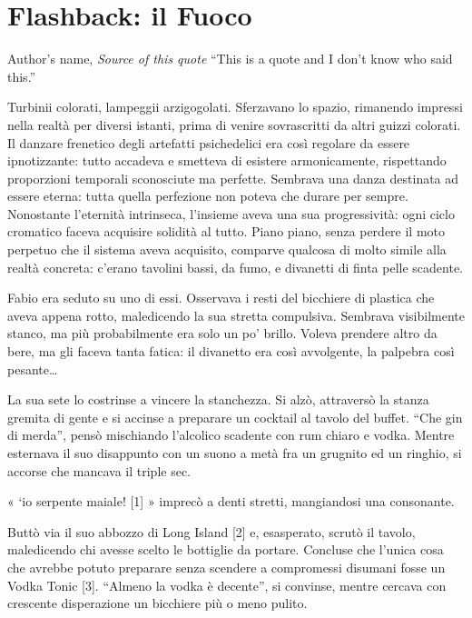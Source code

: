 \chapter{Flashback: il Fuoco}

\begin{chapquote}{Author's name, \textit{Source of this quote}}
``This is a quote and I don't know who said this.''
\end{chapquote}

Turbinii colorati, lampeggii arzigogolati. Sferzavano lo spazio, rimanendo impressi nella realtà per diversi istanti, prima di venire sovrascritti da altri guizzi colorati. Il danzare frenetico degli artefatti psichedelici era così regolare da essere ipnotizzante: tutto accadeva e smetteva di esistere armonicamente, rispettando proporzioni temporali sconosciute ma perfette. Sembrava una danza destinata ad essere eterna: tutta quella perfezione non poteva che durare per sempre. Nonostante l'eternità intrinseca, l'insieme aveva una sua progressività: ogni ciclo cromatico faceva acquisire solidità al tutto. Piano piano, senza perdere il moto perpetuo che il sistema aveva acquisito, comparve qualcosa di molto simile alla realtà concreta: c'erano tavolini bassi, da fumo, e divanetti di finta pelle scadente.

Fabio era seduto su uno di essi. Osservava i resti del bicchiere di plastica che aveva appena rotto, maledicendo la sua stretta compulsiva. Sembrava visibilmente stanco, ma più probabilmente era solo un po' brillo. Voleva prendere altro da bere, ma gli faceva tanta fatica: il divanetto era così avvolgente, la palpebra così pesante\ldots

La sua sete lo costrinse a vincere la stanchezza. Si alzò, attraversò la stanza gremita di gente e si accinse a preparare un cocktail al tavolo del buffet. ``Che gin di merda'', pensò mischiando l'alcolico scadente con rum chiaro e vodka. Mentre esternava il suo disappunto con un suono a metà fra un grugnito ed un ringhio, si accorse che mancava il triple sec.

« `io serpente maiale! [1] » imprecò a denti stretti, mangiandosi una consonante.

Buttò via il suo abbozzo di Long Island [2] e, esasperato, scrutò il tavolo, maledicendo chi avesse scelto le bottiglie da portare. Concluse che l'unica cosa che avrebbe potuto preparare senza scendere a compromessi disumani fosse un Vodka Tonic [3]. ``Almeno la vodka è decente'', si convinse, mentre cercava con crescente disperazione un bicchiere più o meno pulito.

